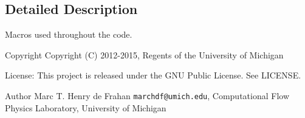 \subsection{Detailed Description}
Macros used throughout the code. \begin{DoxyCopyright}{Copyright}
Copyright (C) 2012-\/2015, Regents of the University of Michigan 
\end{DoxyCopyright}
\begin{DoxyParagraph}{License\-:}
This project is released under the G\-N\-U Public License. See L\-I\-C\-E\-N\-S\-E. 
\end{DoxyParagraph}
\begin{DoxyAuthor}{Author}
Marc T. Henry de Frahan {\tt marchdf@umich.\-edu}, Computational Flow Physics Laboratory, University of Michigan 
\end{DoxyAuthor}
